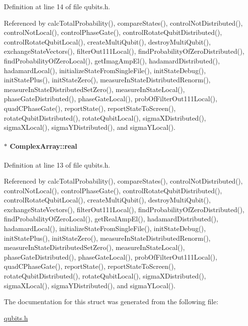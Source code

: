 Definition at line 14 of file qubits.\+h.



Referenced by calc\+Total\+Probability(), compare\+States(), control\+Not\+Distributed(), control\+Not\+Local(), control\+Phase\+Gate(), control\+Rotate\+Qubit\+Distributed(), control\+Rotate\+Qubit\+Local(), create\+Multi\+Qubit(), destroy\+Multi\+Qubit(), exchange\+State\+Vectors(), filter\+Out111\+Local(), find\+Probability\+Of\+Zero\+Distributed(), find\+Probability\+Of\+Zero\+Local(), get\+Imag\+Amp\+El(), hadamard\+Distributed(), hadamard\+Local(), initialize\+State\+From\+Single\+File(), init\+State\+Debug(), init\+State\+Plus(), init\+State\+Zero(), measure\+In\+State\+Distributed\+Renorm(), measure\+In\+State\+Distributed\+Set\+Zero(), measure\+In\+State\+Local(), phase\+Gate\+Distributed(), phase\+Gate\+Local(), prob\+Of\+Filter\+Out111\+Local(), quad\+C\+Phase\+Gate(), report\+State(), report\+State\+To\+Screen(), rotate\+Qubit\+Distributed(), rotate\+Qubit\+Local(), sigma\+X\+Distributed(), sigma\+X\+Local(), sigma\+Y\+Distributed(), and sigma\+Y\+Local().

\paragraph[{\texorpdfstring{real}{real}}]{$\ast$ Complex\+Array\+::real}\hypertarget{structComplexArray_a4195cac6c784ea1b6271f1c7dba1548a}{}\label{structComplexArray_a4195cac6c784ea1b6271f1c7dba1548a}


Definition at line 13 of file qubits.\+h.



Referenced by calc\+Total\+Probability(), compare\+States(), control\+Not\+Distributed(), control\+Not\+Local(), control\+Phase\+Gate(), control\+Rotate\+Qubit\+Distributed(), control\+Rotate\+Qubit\+Local(), create\+Multi\+Qubit(), destroy\+Multi\+Qubit(), exchange\+State\+Vectors(), filter\+Out111\+Local(), find\+Probability\+Of\+Zero\+Distributed(), find\+Probability\+Of\+Zero\+Local(), get\+Real\+Amp\+El(), hadamard\+Distributed(), hadamard\+Local(), initialize\+State\+From\+Single\+File(), init\+State\+Debug(), init\+State\+Plus(), init\+State\+Zero(), measure\+In\+State\+Distributed\+Renorm(), measure\+In\+State\+Distributed\+Set\+Zero(), measure\+In\+State\+Local(), phase\+Gate\+Distributed(), phase\+Gate\+Local(), prob\+Of\+Filter\+Out111\+Local(), quad\+C\+Phase\+Gate(), report\+State(), report\+State\+To\+Screen(), rotate\+Qubit\+Distributed(), rotate\+Qubit\+Local(), sigma\+X\+Distributed(), sigma\+X\+Local(), sigma\+Y\+Distributed(), and sigma\+Y\+Local().



The documentation for this struct was generated from the following file\+:\begin{DoxyCompactItemize}
\item 
\hyperlink{qubits_8h}{qubits.\+h}\end{DoxyCompactItemize}

